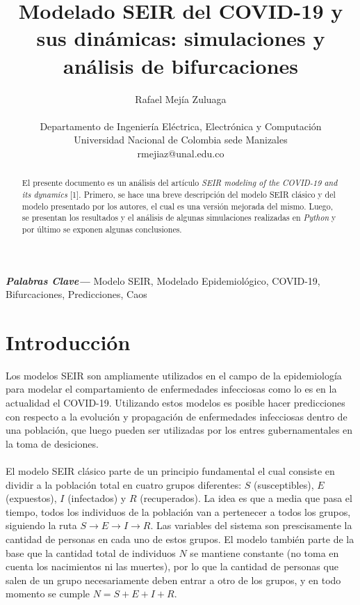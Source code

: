 \documentclass[conference]{IEEEtran}
\providecommand{\keywords}[1]
{
  \small	
  \textbf{\textit{Palabras Clave---}} #1
}
\begin{document}
    

\title{Modelado SEIR del COVID-19 y sus dinámicas: simulaciones y análisis de 
bifurcaciones}

\author{Rafael Mejía Zuluaga \\\\Departamento de Ingeniería Eléctrica, Electrónica y Computación \\ Universidad Nacional de Colombia sede Manizales \\ rmejiaz@unal.edu.co}

\maketitle


\begin{abstract}
    El presente documento es un análisis del artículo \textit{SEIR modeling of the
    COVID-19 and its dynamics} [1]. Primero, se hace una breve descripción del modelo SEIR 
    clásico y del modelo presentado por los autores, el cual es una versión mejorada del mismo.
    Luego, se presentan los resultados y el análisis de algunas simulaciones realizadas en 
    \textit{Python} y por último se exponen algunas conclusiones.  
    \newline
\end{abstract}

\keywords{Modelo SEIR, Modelado Epidemiológico, COVID-19, Bifurcaciones, Predicciones, Caos}

\section{Introducción}
Los modelos SEIR son ampliamente utilizados en el campo de la epidemiología para 
modelar el compartamiento de enfermedades infecciosas como lo es en la actualidad 
el COVID-19. Utilizando estos modelos es posible hacer predicciones con respecto 
a la evolución y propagación de enfermedades infecciosas dentro de una población, que 
luego pueden ser utilizadas por los entres gubernamentales en la toma de desiciones.
\\\\
El modelo SEIR clásico parte de un principio fundamental el cual consiste en dividir a
la población total en cuatro grupos diferentes: $S$ (susceptibles), $E$ (expuestos),
$I$ (infectados) y $R$ (recuperados). La idea es que a media que pasa el tiempo, 
todos los individuos de la población van a pertenecer a todos los grupos, siguiendo la 
ruta $S \rightarrow E \rightarrow I \rightarrow R$. Las variables del sistema son
prescisamente la cantidad de personas en cada uno de estos grupos. El modelo también 
parte de la base que la cantidad total de individuos $N$ se mantiene constante (no toma en
cuenta los nacimientos ni las muertes), por lo que la cantidad de personas que salen de
un grupo necesariamente deben entrar a otro de los grupos, y en todo momento se cumple
$N = S + E + I + R$.
\end{document}

